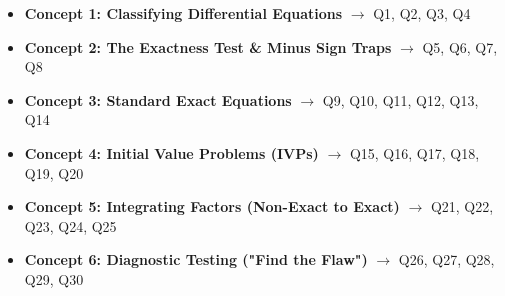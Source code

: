 \documentclass[11pt]{article}
\begin{document}
\begin{itemize}
    \item \textbf{Concept 1: Classifying Differential Equations} $\rightarrow$ Q1, Q2, Q3, Q4
    \item \textbf{Concept 2: The Exactness Test \& Minus Sign Traps} $\rightarrow$ Q5, Q6, Q7, Q8
    \item \textbf{Concept 3: Standard Exact Equations} $\rightarrow$ Q9, Q10, Q11, Q12, Q13, Q14
    \item \textbf{Concept 4: Initial Value Problems (IVPs)} $\rightarrow$ Q15, Q16, Q17, Q18, Q19, Q20
    \item \textbf{Concept 5: Integrating Factors (Non-Exact to Exact)} $\rightarrow$ Q21, Q22, Q23, Q24, Q25
    \item \textbf{Concept 6: Diagnostic Testing ("Find the Flaw")} $\rightarrow$ Q26, Q27, Q28, Q29, Q30
\end{itemize}
\end{document}

